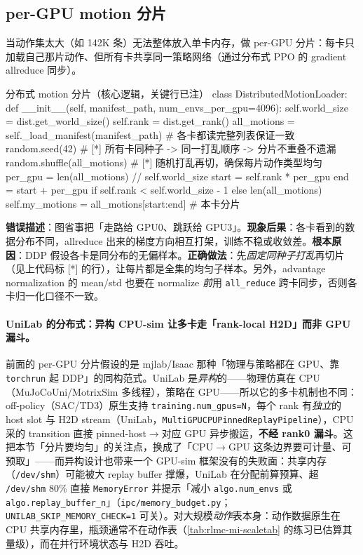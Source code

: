 \subsection{per-GPU motion 分片}
\label{sec:rlmc-mi-scale-shard}

当动作集太大（如 142K 条）无法整体放入单卡内存，做 per-GPU 分片：每卡只加载自己那片动作、但所有卡共享同一策略网络（通过分布式 PPO 的 gradient allreduce 同步）。

\begin{codebox}[Python]{分布式 motion 分片（核心逻辑，关键行已注）}
class DistributedMotionLoader:
    def __init__(self, manifest_path, num_envs_per_gpu=4096):
        self.world_size = dist.get_world_size()
        self.rank = dist.get_rank()
        all_motions = self._load_manifest(manifest_path)  # 各卡都读完整列表保证一致
        random.seed(42)              # [*] 所有卡同种子 -> 同一打乱顺序 -> 分片不重叠不遗漏
        random.shuffle(all_motions)  # [*] 随机打乱再切，确保每片动作类型均匀
        per_gpu = len(all_motions) // self.world_size
        start = self.rank * per_gpu
        end = start + per_gpu if self.rank < self.world_size - 1 else len(all_motions)
        self.my_motions = all_motions[start:end]          # 本卡分片
\end{codebox}

\begin{pitfall}
\textbf{错误描述}：图省事把「走路给 GPU0、跳跃给 GPU3」。\textbf{现象后果}：各卡看到的数据分布不同，allreduce 出来的梯度方向相互打架，训练不稳或收敛差。\textbf{根本原因}：DDP 假设各卡是同分布的无偏样本。\textbf{正确做法}：先\emph{固定同种子打乱}再切片（见上代码标 [*] 的行），让每片都是全集的均匀子样本。另外，advantage normalization 的 mean/std 也要在 normalize \emph{前}用 \verb|all_reduce| 跨卡同步，否则各卡归一化口径不一致。
\end{pitfall}

\paragraph{UniLab 的分布式：异构 CPU-sim 让多卡走「rank-local H2D」而非 GPU 漏斗。}前面的 per-GPU 分片假设的是 mjlab/Isaac 那种「物理与策略都在 GPU、靠 \verb|torchrun| 起 DDP」的同构范式。UniLab 是\emph{异构}的——物理仿真在 CPU（MuJoCoUni/MotrixSim 多线程），策略在 GPU——所以它的多卡机制也不同：off-policy（SAC/TD3）原生支持 \verb|training.num_gpus=N|，每个 rank 有\emph{独立}的 host slot 与 H2D stream（UniLab，\verb|MultiGPUCPUPinnedReplayPipeline|），CPU 采的 transition 直接 pinned-host$\to$对应 GPU 异步搬运，\textbf{不经 rank0 漏斗}。这把本节「分片要均匀」的关注点，换成了「CPU$\to$GPU 这条边界要可计量、可预取」——而异构设计也带来一个 GPU-sim 框架没有的失败面：共享内存（\verb|/dev/shm|）可能被大 replay buffer 撑爆，UniLab 在分配前算预算、超 \verb|/dev/shm| 80\% 直接 \verb|MemoryError| 并提示「减小 \verb|algo.num_envs| 或 \verb|algo.replay_buffer_n|」（\verb|ipc/memory_budget.py|；\verb|UNILAB_SKIP_MEMORY_CHECK=1| 可关）。对大规模\emph{动作}表本身：动作数据原生在 CPU 共享内存里，瓶颈通常不在动作表（\cref{tab:rlmc-mi-scaletab} 的练习已估算其量级），而在并行环境状态与 H2D 吞吐。

